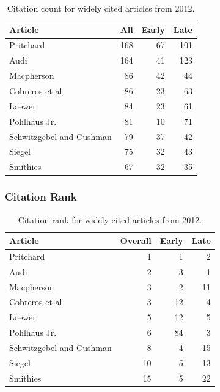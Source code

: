 \documentclass[
  10pt,
  letterpaper,
  DIV=11,
  numbers=noendperiod,
  twoside]{scrartcl}
\begin{document}
\begin{longtable}[]{@{}lrrr@{}}

\caption{\label{tbl-citation-count-2012}Citation count for widely cited
articles from 2012.}

\tabularnewline

\toprule\noalign{}
Article & All & Early & Late \\
\midrule\noalign{}
\endhead
\bottomrule\noalign{}
\endlastfoot
Pritchard & 168 & 67 & 101 \\
Audi & 164 & 41 & 123 \\
Macpherson & 86 & 42 & 44 \\
Cobreros et al & 86 & 23 & 63 \\
Loewer & 84 & 23 & 61 \\
Pohlhaus Jr. & 81 & 10 & 71 \\
Schwitzgebel and Cushman & 79 & 37 & 42 \\
Siegel & 75 & 32 & 43 \\
Smithies & 67 & 32 & 35 \\

\end{longtable}

\subsubsection*{Citation Rank}\label{sec-rank-2012}

\begin{longtable}[]{@{}lrrr@{}}

\caption{\label{tbl-citation-rank-2012}Citation rank for widely cited
articles from 2012.}

\tabularnewline

\toprule\noalign{}
Article & Overall & Early & Late \\
\midrule\noalign{}
\endhead
\bottomrule\noalign{}
\endlastfoot
Pritchard & 1 & 1 & 2 \\
Audi & 2 & 3 & 1 \\
Macpherson & 3 & 2 & 11 \\
Cobreros et al & 3 & 12 & 4 \\
Loewer & 5 & 12 & 5 \\
Pohlhaus Jr. & 6 & 84 & 3 \\
Schwitzgebel and Cushman & 8 & 4 & 15 \\
Siegel & 10 & 5 & 13 \\
Smithies & 15 & 5 & 22 \\

\end{longtable}
\end{document}
